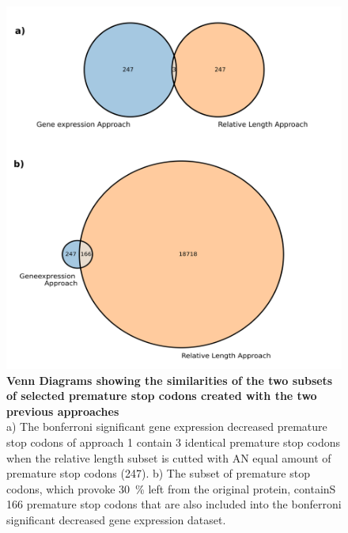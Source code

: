 \begin{figure}[h!]
  \centering
  \begin{minipage}[h]{0.9\textwidth}
    \centering
    \includegraphics[width=1\textwidth]{images/Venn_Diagramms.png}
    \caption[Venn Diagrams showing the similarities of selected premature stop codons  of the two subsets created with the two previous approaches]{\textbf{Venn Diagrams showing the similarities of the two subsets of selected premature stop codons  created with the two previous approaches}\\
    a) The bonferroni significant gene expression decreased premature stop codons of approach 1 contain 3 identical premature stop codons when the relative length subset is cutted with AN equal amount of premature stop codons (247). b)
    The subset of premature stop codons, which provoke \SI{30}{\percent} left from the original protein, containS 166 premature stop codons that are also included into the bonferroni significant decreased gene expression dataset.}
    
   \label{fig:Venn_Diagram}
  \end{minipage}
\end{figure} 

